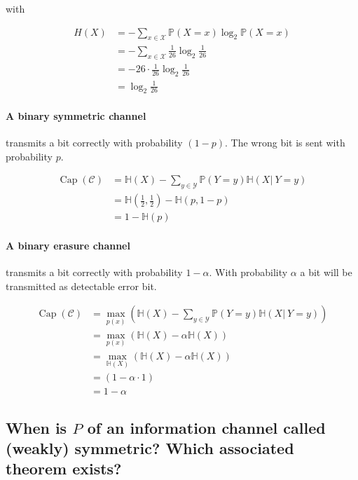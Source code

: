 \documentclass[a4paper]{article}
\newcommand\op[2][P]{\mathbb{#1}\left(#2\right)}
\newcommand\cond[3][P]{\mathbb{#1}\left(#2 \left|\:#3\right)\right.}
\DeclareMathOperator{\Capacity}{Cap}
\theoremstyle{definition}
\begin{document}
with

\begin{align*}
  H(X) &= -\sum_{x \in \mathcal X} \op{X=x} \log_2 \op{X=x} \\
       &= -\sum_{x \in \mathcal X} \frac{1}{26} \log_2 \frac{1}{26} \\
       &= -26 \cdot \frac{1}{26} \log_2 \frac{1}{26} \\
       &= \log_2 \frac1{26}
\end{align*}

\paragraph{A binary symmetric channel} transmits a bit correctly
with probability $(1-p)$. The wrong bit is sent with probability $p$.

\begin{align*}
  \Capacity(\mathcal{C}) &= \op[H]{X} - \sum_{y \in \mathcal Y} \op{Y=y} \cond[H]{X}{Y=y} \\
                         &= \op[H]{\frac12, \frac12} - \op[H]{p, 1-p} \\
                         &= 1 - \op[H]{p}
\end{align*}

\paragraph{A binary erasure channel} transmits a bit correctly with probability
$1 - \alpha$. With probability $\alpha$ a bit will be transmitted as detectable
error bit.

\begin{align*}
  \Capacity(\mathcal C) &= \max_{p(x)}\left(\op[H]{X} - \sum_{y \in \mathcal Y} \op{Y=y} \cond[H]{X}{Y=y}\right) \\
                        &= \max_{p(x)}\left(\op[H]{X} - \alpha \op[H]{X}\right) \\
                        &= \max_{\op[H]{X}}\left(\op[H]{X} - \alpha \op[H]{X}\right) \\
                        &= \left(1 - \alpha \cdot 1\right) \\
                        &= 1 - \alpha
\end{align*}

\subsection{When is $P$ of an information channel called (weakly) symmetric? Which associated theorem exists?}
\end{document}
